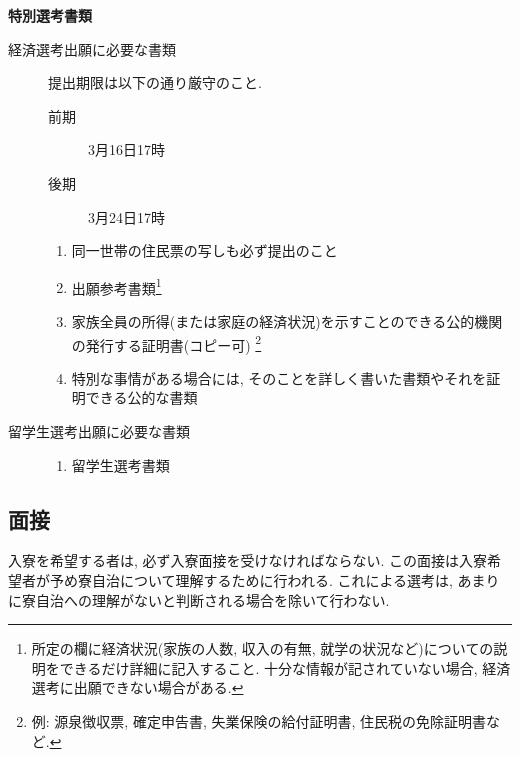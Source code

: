 \documentclass[10pt,b5jsbook,dvips,dvipdfmx,openany]{jsbook}
\theoremstyle{definition}
\begin{document}
		\begin{itembox}[l]{\bf 特別選考書類}

		\begin{description}
		\item[経済選考出願に必要な書類]

		提出期限は以下の通り厳守のこと.
			\begin{description}
			\item[前期]3月16日17時
			\item[後期]3月24日17時
			\end{description}

			\begin{enumerate}
			\setcounter{enumi}{\value{mymemory}}
			\item 同一世帯の住民票の写しも必ず提出のこと
			\item 出願参考書類\footnote{所定の欄に経済状況(家族の人数, 収入の有無, 就学の状況など)についての説明をできるだけ詳細に記入すること. 十分な情報が記されていない場合, 経済選考に出願できない場合がある. }
			\item  家族全員の所得(または家庭の経済状況)を示すことのできる公的機関の発行する証明書(コピー可) \footnote{例: 源泉徴収票, 確定申告書, 失業保険の給付証明書, 住民税の免除証明書など. }
			\item 特別な事情がある場合には, そのことを詳しく書いた書類やそれを証明できる公的な書類
			\setcounter{mymemory}{\value{enumi}}
			\end{enumerate}

		\item[留学生選考出願に必要な書類]

			\begin{enumerate}
			\setcounter{enumi}{\value{mymemory}}
			\item 留学生選考書類
			\end{enumerate}
		\end{description}

		\end{itembox}

		\subsection{面接}
		入寮を希望する者は, 必ず入寮面接を受けなければならない. この面接は入寮希望者が予め寮自治について理解するために行われる. これによる選考は, あまりに寮自治への理解がないと判断される場合を除いて行わない.
\end{document}

